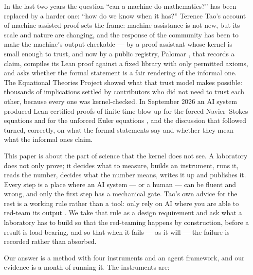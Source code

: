 \documentclass[11pt]{article}
\begin{document}
In the last two years the question ``can a machine do mathematics?'' has been replaced by a
harder one: ``how do we know when it has?'' Terence Tao's account of machine-assisted proof
\cite{tao2025} sets the frame: machine assistance is not new, but its scale and nature are
changing, and the response of the community has been to make the machine's output checkable ---
by a proof assistant whose kernel is small enough to trust, and now by a public registry, Palomar
\cite{palomar2026}, that records a claim, compiles its Lean proof against a fixed library with
only permitted axioms, and asks whether the formal statement is a fair rendering of the informal
one. The Equational Theories Project \cite{etp2025} showed what that trust model makes possible:
thousands of implications settled by contributors who did not need to trust each other, because
every one was kernel-checked. In September 2026 an AI system produced Lean-certified proofs of
finite-time blow-up for the forced Navier--Stokes equations and for the unforced Euler equations
\cite{openai2026}, and the discussion that followed turned, correctly, on what the formal
statements say and whether they mean what the informal ones claim.

This paper is about the part of science that the kernel does not see. A laboratory does not
only prove; it decides what to measure, builds an instrument, runs it, reads the number, decides
what the number means, writes it up and publishes it. Every step is a place where an AI system
--- or a human --- can be fluent and wrong, and only the first step has a mechanical gate. Tao's
own advice for the rest is a working rule rather than a tool: only rely on AI where you are
able to red-team its output \cite{taoviews2026}. We take that rule as a design requirement and ask what
a laboratory has to build so that the red-teaming happens by construction, before a result is
load-bearing, and so that when it fails --- as it will --- the failure is recorded rather than
absorbed.

Our answer is a method with four instruments and an agent framework, and our evidence is a
month of running it. The instruments are:
\end{document}
